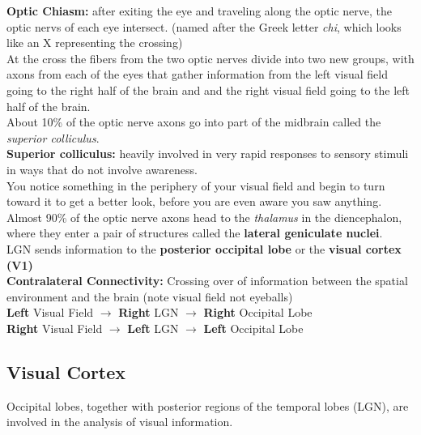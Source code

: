 \documentclass{article}
\begin{document}
\textbf{Optic Chiasm:} after exiting the eye and traveling along the optic nerve, the optic nervs of each eye intersect. (named after the Greek letter \textit{chi}, which looks like an X representing the crossing) \\

At the cross the fibers from the two optic nerves divide into two new groups, with axons from each of the eyes that gather information from the left visual field going to the right half of the brain and and the right visual field going to the left half of the brain. \\

About 10\% of the optic nerve axons go into part of the midbrain called the \textit{superior colliculus}. \\

\noindent \textbf{Superior colliculus:} heavily involved in very rapid responses to sensory stimuli in ways that do not involve awareness.\\
You notice something in the periphery of your visual field and begin to turn toward it to get a better look, before you are even aware you saw anything. \\

Almost 90\% of the optic nerve axons head to the \textit{thalamus} in the diencephalon, where they enter a pair of  structures called the \textbf{lateral geniculate nuclei}. \\

LGN sends information to the \textbf{posterior occipital lobe} or the \textbf{visual cortex (V1)} \\

\noindent \textbf{Contralateral Connectivity:} Crossing over of information between the spatial environment and the brain (note visual field not eyeballs)\\
\noindent \textbf{Left} Visual Field $\rightarrow$ \textbf{Right} LGN $\rightarrow$ \textbf{Right} Occipital Lobe\\
\textbf{Right} Visual Field $\rightarrow$ \textbf{Left} LGN $\rightarrow$ \textbf{Left} Occipital Lobe \\

\subsection{Visual Cortex}
Occipital lobes, together with posterior regions of the temporal lobes (LGN), are involved in the analysis of visual information. \\
\end{document}
